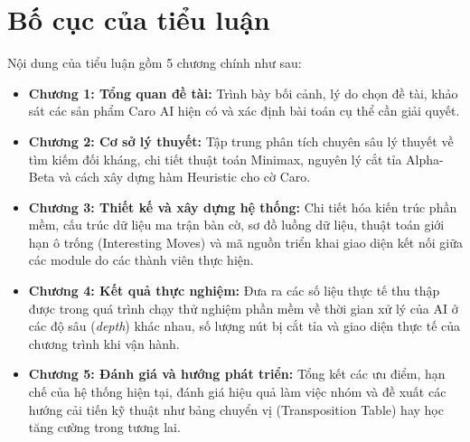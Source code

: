 \section*{Bố cục của tiểu luận}
Nội dung của tiểu luận gồm 5 chương chính như sau:
\begin{itemize}
	\item \textbf{Chương 1: Tổng quan đề tài:} Trình bày bối cảnh, lý do chọn đề tài, khảo sát các sản phẩm Caro AI hiện có và xác định bài toán cụ thể cần giải quyết.
	\item \textbf{Chương 2: Cơ sở lý thuyết:} Tập trung phân tích chuyên sâu lý thuyết về tìm kiếm đối kháng, chi tiết thuật toán Minimax, nguyên lý cắt tỉa Alpha-Beta và cách xây dựng hàm Heuristic cho cờ Caro.
	\item \textbf{Chương 3: Thiết kế và xây dựng hệ thống:} Chi tiết hóa kiến trúc phần mềm, cấu trúc dữ liệu ma trận bàn cờ, sơ đồ luồng dữ liệu, thuật toán giới hạn ô trống (Interesting Moves) và mã nguồn triển khai giao diện kết nối giữa các module do các thành viên thực hiện.
	\item \textbf{Chương 4: Kết quả thực nghiệm:} Đưa ra các số liệu thực tế thu thập được trong quá trình chạy thử nghiệm phần mềm về thời gian xử lý của AI ở các độ sâu (\textit{depth}) khác nhau, số lượng nút bị cắt tỉa và giao diện thực tế của chương trình khi vận hành.
	\item \textbf{Chương 5: Đánh giá và hướng phát triển:} Tổng kết các ưu điểm, hạn chế của hệ thống hiện tại, đánh giá hiệu quả làm việc nhóm và đề xuất các hướng cải tiến kỹ thuật như bảng chuyển vị (Transposition Table) hay học tăng cường trong tương lai.
\end{itemize}